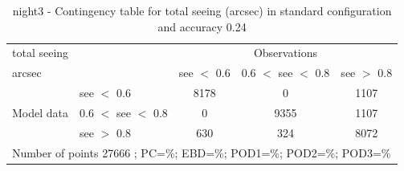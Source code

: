 \begin{table}[p!]
\begin{center}
\begin{tabular}{llccc}
\hline
{total seeing}                                       &                                                    & \multicolumn{3}{c}{Observations}                 \\
{arcsec}                                       &                             & see $<$ 0.6   & 0.6 $<$ see $<$ 0.8 & see $>$ 0.8 \\
\hline
\multicolumn{1}{c}{\multirow{3}{*}{Model data}}  & see $<$ 0.6             & 8178                & 0                       & 1107              \\
                                                 & 0.6  $<$ see $<$ 0.8 & 0                & 9355                       & 1107              \\
                                                 & see $>$ 0.8             & 630                & 324                       & 8072              \\
\hline
\multicolumn{5}{l}{ Number of points        27666 ; PC=\%; EBD=\%; POD1=\%; POD2=\%; POD3=\%}
\end{tabular}
\end{center}
\caption{night3 - Contingency table for  total seeing (arcsec) in standard configuration and accuracy 0.24}
\label{tab:contingencyseeBEF:night3}
\end{table}
